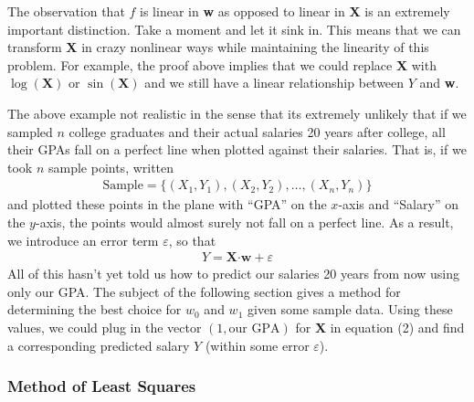 \documentclass[11pt,letterpaper]{article}
\newcommand\eps{\varepsilon}
\numberwithin{theorem}{section}
\numberwithin{definition}{section}
\numberwithin{lemma}{section}
\numberwithin{corollary}{section}
\numberwithin{proposition}{section}
\theoremstyle{definition}
\numberwithin{remark}{section}
\numberwithin{claim}{section}
\numberwithin{observation}{section}
\numberwithin{fact}{section}
\numberwithin{assumption}{section}
\numberwithin{example}{section}
\numberwithin{exercise}{section}
\begin{document}
The observation that $f$ is linear in \textbf{w} as opposed to linear in \textbf{X} is an extremely important distinction. Take a moment and let it sink in. This means that we can transform \textbf{X} in crazy nonlinear ways while maintaining the linearity of this problem. For example, the proof above implies that we could replace \textbf{X} with $\log(\textbf{X})$ or $\sin(\textbf{X})$ and we still have a linear relationship between $Y$ and \textbf{w}. 


The above example not realistic in the sense that its extremely unlikely that if we sampled $n$ college graduates and their actual salaries 20 years after college, all their GPAs fall on a perfect line when plotted against their salaries. That is, if we took $n$ sample points, written
\begin{align*}
\text{Sample} = \{(X_1,Y_1),(X_2,Y_2),\dots,(X_n,Y_n)\}
\end{align*}
and plotted these points in the plane with ``GPA'' on the $x$-axis and ``Salary'' on the $y$-axis, the points would almost surely not fall on a perfect line. As a result, we introduce an error term $\eps$, so that
\begin{align}
Y = \textbf{X} \boldsymbol{\cdot} \textbf{w} + \eps
\end{align}
All of this hasn't yet told us how to predict our salaries 20 years from now using only our GPA. The subject of the following section gives a method for determining the best choice for $w_0$ and $w_1$ given some sample data. Using these values, we could plug in the vector $(1,\text{our GPA})$ for \textbf{X} in equation (2) and find a corresponding predicted salary $Y$ (within some error $\eps$).

\subsubsection{Method of Least Squares}
\end{document}
